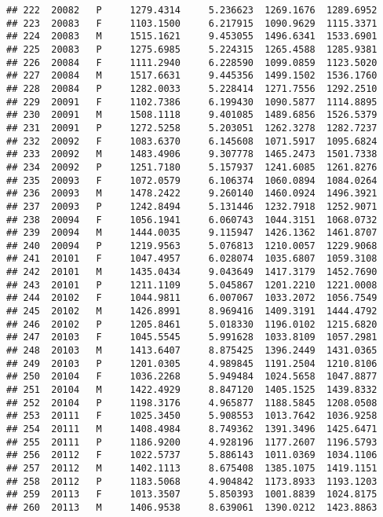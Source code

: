 \documentclass[]{article}
\begin{document}
\begin{verbatim}
## 222  20082   P     1279.4314     5.236623  1269.1676  1289.6952
## 223  20083   F     1103.1500     6.217915  1090.9629  1115.3371
## 224  20083   M     1515.1621     9.453055  1496.6341  1533.6901
## 225  20083   P     1275.6985     5.224315  1265.4588  1285.9381
## 226  20084   F     1111.2940     6.228590  1099.0859  1123.5020
## 227  20084   M     1517.6631     9.445356  1499.1502  1536.1760
## 228  20084   P     1282.0033     5.228414  1271.7556  1292.2510
## 229  20091   F     1102.7386     6.199430  1090.5877  1114.8895
## 230  20091   M     1508.1118     9.401085  1489.6856  1526.5379
## 231  20091   P     1272.5258     5.203051  1262.3278  1282.7237
## 232  20092   F     1083.6370     6.145608  1071.5917  1095.6824
## 233  20092   M     1483.4906     9.307778  1465.2473  1501.7338
## 234  20092   P     1251.7180     5.157937  1241.6085  1261.8276
## 235  20093   F     1072.0579     6.106374  1060.0894  1084.0264
## 236  20093   M     1478.2422     9.260140  1460.0924  1496.3921
## 237  20093   P     1242.8494     5.131446  1232.7918  1252.9071
## 238  20094   F     1056.1941     6.060743  1044.3151  1068.0732
## 239  20094   M     1444.0035     9.115947  1426.1362  1461.8707
## 240  20094   P     1219.9563     5.076813  1210.0057  1229.9068
## 241  20101   F     1047.4957     6.028074  1035.6807  1059.3108
## 242  20101   M     1435.0434     9.043649  1417.3179  1452.7690
## 243  20101   P     1211.1109     5.045867  1201.2210  1221.0008
## 244  20102   F     1044.9811     6.007067  1033.2072  1056.7549
## 245  20102   M     1426.8991     8.969416  1409.3191  1444.4792
## 246  20102   P     1205.8461     5.018330  1196.0102  1215.6820
## 247  20103   F     1045.5545     5.991628  1033.8109  1057.2981
## 248  20103   M     1413.6407     8.875425  1396.2449  1431.0365
## 249  20103   P     1201.0305     4.989845  1191.2504  1210.8106
## 250  20104   F     1036.2268     5.949484  1024.5658  1047.8877
## 251  20104   M     1422.4929     8.847120  1405.1525  1439.8332
## 252  20104   P     1198.3176     4.965877  1188.5845  1208.0508
## 253  20111   F     1025.3450     5.908553  1013.7642  1036.9258
## 254  20111   M     1408.4984     8.749362  1391.3496  1425.6471
## 255  20111   P     1186.9200     4.928196  1177.2607  1196.5793
## 256  20112   F     1022.5737     5.886143  1011.0369  1034.1106
## 257  20112   M     1402.1113     8.675408  1385.1075  1419.1151
## 258  20112   P     1183.5068     4.904842  1173.8933  1193.1203
## 259  20113   F     1013.3507     5.850393  1001.8839  1024.8175
## 260  20113   M     1406.9538     8.639061  1390.0212  1423.8863

\end{verbatim}
\end{document}
